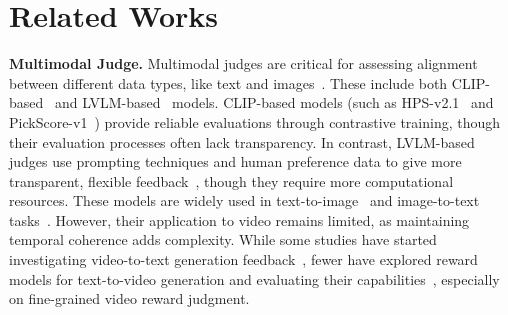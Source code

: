 \section{Related Works}

\textbf{Multimodal Judge.} Multimodal judges are critical for assessing alignment between different data types, like text and images~\citep{ziegler2019fine, xu2021videoclipcontrastivepretrainingzeroshot, badlani2021ttsalignmentrule, chen2024autoprm, zhang2024grape, wang2024preference}. These include both CLIP-based~\citep{radford2021learning} and LVLM-based~\citep{wang2023visionllmlargelanguagemodel, chameleonteam2024chameleonmixedmodalearlyfusionfoundation, xie2024showosingletransformerunify} models. CLIP-based models (such as HPS-v2.1~\citep{wu2023human} and PickScore-v1~\citep{kirstain2023pick}) provide reliable evaluations through contrastive training, though their evaluation processes often lack transparency. In contrast, LVLM-based judges use prompting techniques and human preference data to give more transparent, flexible feedback~\citep{chen2024mllm, he2024videoscore, wang2024interpretablepreferencesmultiobjectivereward}, though they require more computational resources. These models are widely used in text-to-image~\citep{wallace2024diffusion, chen2024mjbenchmultimodalrewardmodel, yuan2024instructvideo} and image-to-text tasks~\citep{zhou2024calibrated, chen2024halc, cui2024fine}. However, their application to video remains limited, as maintaining temporal coherence adds complexity. While some studies have started investigating video-to-text generation feedback~\citep{escontrela2024video, he2024videoscore,chen2024safewatch}, fewer have explored reward models for text-to-video generation and evaluating their capabilities~\citep{he2024mantisscore, yuan2024instructvideo}, especially on fine-grained video reward judgment.


